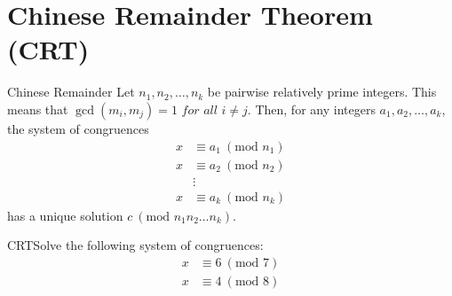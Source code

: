 \renewcommand{\theenumi}{\arabic{enumi}}
\renewcommand{\labelenumi}{\theenumi.}
\section{Chinese Remainder Theorem (CRT)}

\begin{theorem}
    {Chinese Remainder} Let \(n_1, n_2, \ldots, n_k\) be pairwise relatively prime integers. This means that \(\gcd(m_i,m_j) = 1 \textit{ for all } i \ne j\). Then, for any integers \(a_1, a_2, \ldots, a_k\), the system of congruences \begin{align*}
        x & \equiv a_1 \ (\text{mod } n_1) \\
        x & \equiv a_2 \ (\text{mod } n_2) \\
          & \vdots                         \\
        x & \equiv a_k \ (\text{mod } n_k)
    \end{align*} has a unique solution \(c \ (\text{mod } n_1n_2 \ldots n_k)\).
\end{theorem}

\begin{example}
    {CRT}Solve the following system of congruences: \begin{align*}
        x & \equiv 6 \ (\text{mod } 7) \\
        x & \equiv 4 \ (\text{mod } 8)
    \end{align*}
\end{example}



